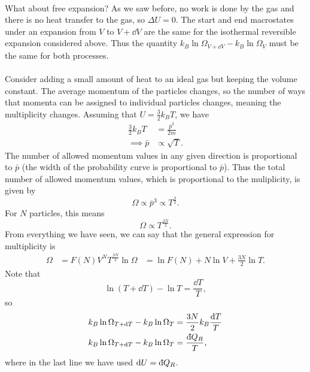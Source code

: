 \documentclass[../thermodynamics.tex]{subfiles}
\begin{document}
        \paragraph{}
        What about free expansion?
        As we saw before, no work is done by the gas and there is no heat transfer to the gas, so $\Delta U=0$.
        The start and end macrostates under an expansion from $V$ to $V+\dd{V}$ are the same for the isothermal reversible expansion considered above.
        Thus the quantity $k_B\ln\Omega_{V+\dd{V}}-k_B\ln\Omega_V$ must be the same for both processes.

        \paragraph{}
        Consider adding a small amount of heat to an ideal gas but keeping the volume constant.
        The average momentum of the particles changes, so the number of ways that momenta can be assigned to individual particles changes, meaning the multiplicity changes.
        Assuming that $U=\frac{3}{2}k_BT$, we have
        \begin{align}
            \frac{3}{2}k_BT&=\frac{\bar{p}^2}{2m}\\
            \implies\bar{p}&\propto\sqrt{T}.
        \end{align}
        The number of allowed momentum values in any given direction is proportional to $\bar{p}$ (the width of the probability curve is proportional to $\bar{p}$).
        Thus the total number of allowed momentum values, which is proportional to the muliplicity, is given by
        \begin{equation}
            \Omega\propto\bar{p}^3\propto T^\frac{3}{2}.
        \end{equation}
        For $N$ particles, this means
        \begin{equation}
            \Omega\propto T^\frac{3N}{2}.
        \end{equation}
        From everything we have seen, we can say that the general expression for multiplicity is
        \begin{align}
            \Omega&=F(N)V^NT^\frac{3N}{2}
            \ln\Omega&=\ln F(N)+N\ln V+\frac{3N}{2}\ln T.
        \end{align}
        Note that
        \begin{equation}
            \ln(T+\dd{T})-\ln T=\frac{\dd{T}}{T},
        \end{equation}
        so
        \begin{align}
            k_B\ln\Omega_{T+\dd{T}}-k_B\ln\Omega_T&=\frac{3N}{2}k_B\frac{\dd{T}}{T}\\
            k_B\ln\Omega_{T+\dd{T}}-k_B\ln\Omega_T&=\frac{\dbar{Q}_R}{T},
        \end{align}
        where in the last line we have used $\dd{U}=\dbar{Q}_R$.
\end{document}

